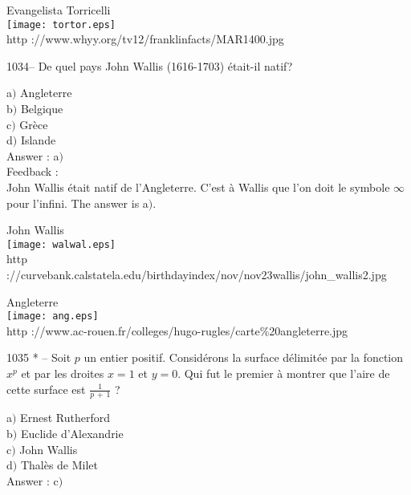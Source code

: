 ﻿\documentclass[letterpaper, 12pt]{article}
\begin{document}
        \begin{center}
        Evangelista Torricelli\\
    \texttt{[image: tortor.eps]}\\
        {\footnotesize http ://www.whyy.org/tv12/franklinfacts/MAR1400.jpg}
    \end{center}

1034-- De quel pays John Wallis (1616-1703) \'etait-il natif?

a$)$ Angleterre \\
b$)$ Belgique \\
c$)$ Gr\`ece  \\
d$)$ Islande \\

Answer : a$)$\\

Feedback :\\
John Wallis \'etait natif de l'Angleterre. C'est \`a Wallis que l'on
doit le symbole $\infty$ pour l'infini.
The answer is a$)$.\\

        \begin{center}
        John Wallis\\[2mm]
    \texttt{[image: walwal.eps]}\\
        {\footnotesize http
://curvebank.calstatela.edu/birthdayindex/nov/nov23wallis/john\_wallis2.jpg}
    \end{center}

        \begin{center}
        Angleterre\\
    \texttt{[image: ang.eps]}\\
        {\footnotesize http
://www.ac-rouen.fr/colleges/hugo-rugles/carte\%20angleterre.jpg}
    \end{center}

1035 * -- Soit $p$ un entier positif. Consid\'erons la surface
d\'elimit\'ee par la fonction $x^p$ et par les droites $x=1$ et
$y=0$. Qui fut le premier \`a montrer que l'aire de cette surface
est $\frac1{p\,+\,1}$ ?

a$)$ Ernest Rutherford \\
b$)$ Euclide d'Alexandrie  \\
c$)$ John Wallis  \\
d$)$ Thal\`es de Milet \\

Answer : c$)$\\
\end{document}
